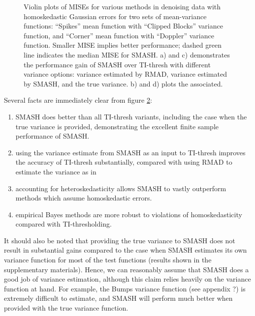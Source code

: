 \documentclass[12pt]{article}
\begin{document}
\begin{figure}
\begin{subfigure}[b]{0.45\textwidth}
        \caption{}
        \label{fig:gaus_hetero_sd_2}
    \end{subfigure}
    \caption{Violin plots of MISEs for various methods in denoising data with homoskedastic Gaussian errors for two sets of mean-variance functions: ``Spikes'' mean function with ``Clipped Blocks'' variance function, and ``Corner'' mean function with ``Doppler'' variance function. Smaller MISE implies better performance; dashed green line indicates the median MISE for SMASH. a) and c) demonstrates the performance gain of SMASH over TI-thresh with different variance options: variance estimated by RMAD, variance estimated by SMASH, and the true variance. b) and d) plots the associated.}
    \label{fig:gaus_hetero}
\end{figure}


Several facts are immediately clear from figure \ref{fig:gaus_hetero}: 
\begin{enumerate}
\item SMASH does better than all TI-thresh variants, including the case when the true variance is provided, demonstrating the excellent finite sample performance of SMASH.
\item using the variance estimate from SMASH as an input to TI-thresh improves the accuracy of TI-thresh substantially, compared with using RMAD to estimate the variance as in \cite{Gao1997Wavelet}
\item accounting for heteroskedasticity allows SMASH to vastly outperform methods which assume homoskedastic errors.
\item empirical Bayes methods are more robust to violations of homoskedasticity compared with TI-thresholding.
\end{enumerate}

It should also be noted that providing the true variance to SMASH does not result in substantial gains compared to the case when SMASH estimates its own variance function for most of the test functions (results shown in the supplementary materials). Hence, we can reasonably assume that SMASH does a good job of variance estimation, although this claim relies heavily on the variance function at hand. For example, the Bumps variance function (see appendix ?) is extremely difficult to estimate, and SMASH will perform much better when provided with the true variance function.
\end{document}
